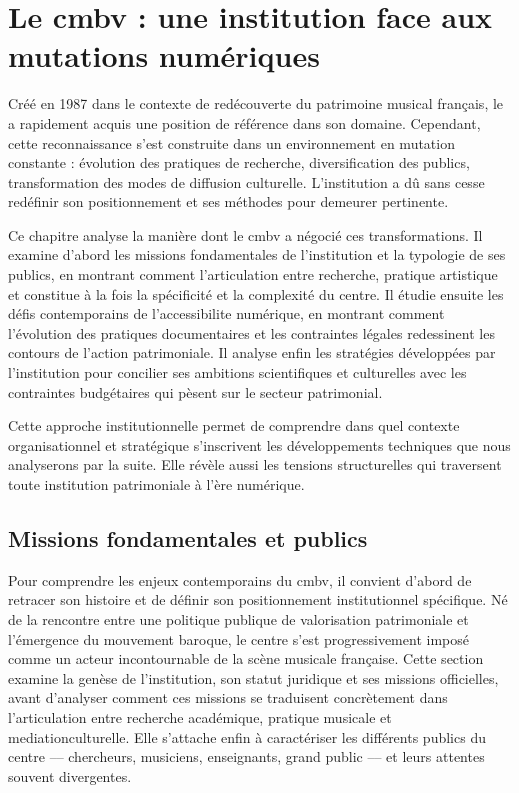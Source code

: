 \chapter[Le \gls{cmbv}]{Le \gls{cmbv} : une institution face aux mutations numériques}

Créé en 1987 dans le contexte de redécouverte du patrimoine musical français, le  a rapidement acquis une position de référence dans son domaine. Cependant, cette reconnaissance s'est construite dans un environnement en mutation constante : évolution des pratiques de recherche, diversification des publics, transformation des modes de diffusion culturelle. L'institution a dû sans cesse redéfinir son positionnement et ses méthodes pour demeurer pertinente.

Ce chapitre analyse la manière dont le \gls{cmbv} a négocié ces transformations. Il examine d'abord les missions fondamentales de l'institution et la typologie de ses publics, en montrant comment l'articulation entre recherche, pratique artistique et  constitue à la fois la spécificité et la complexité du centre. Il étudie ensuite les défis contemporains de l'\gls{accessibilite} numérique, en montrant comment l'évolution des pratiques documentaires et les contraintes légales redessinent les contours de l'action patrimoniale. Il analyse enfin les stratégies développées par l'institution pour concilier ses ambitions scientifiques et culturelles avec les contraintes budgétaires qui pèsent sur le secteur patrimonial.

Cette approche institutionnelle permet de comprendre dans quel contexte organisationnel et stratégique s'inscrivent les développements techniques que nous analyserons par la suite. Elle révèle aussi les tensions structurelles qui traversent toute institution patrimoniale à l'ère numérique.

\section{Missions fondamentales et publics}

Pour comprendre les enjeux contemporains du \gls{cmbv}, il convient d'abord de retracer son histoire et de définir son positionnement institutionnel spécifique. Né de la rencontre entre une politique publique de valorisation patrimoniale et l'émergence du mouvement baroque, le centre s'est progressivement imposé comme un acteur incontournable de la scène musicale française. Cette section examine la genèse de l'institution, son statut juridique et ses missions officielles, avant d'analyser comment ces missions se traduisent concrètement dans l'articulation entre recherche académique, pratique musicale et \gls{mediationculturelle}. Elle s'attache enfin à caractériser les différents publics du centre --– chercheurs, musiciens, enseignants, grand public --– et leurs attentes souvent divergentes.

